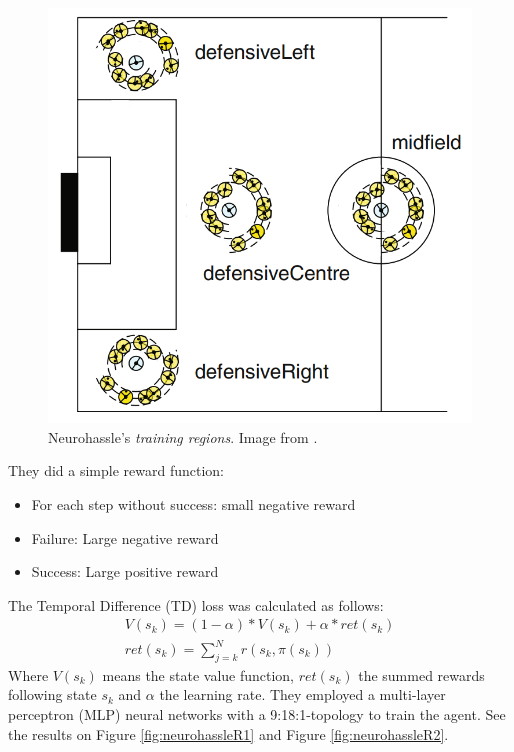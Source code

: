 \begin{figure}[H]
    \centering
    \includegraphics[scale=0.25]{images/neurohassleTR.png}
    \caption{Neurohassle's \textit{training regions}. Image from \cite{neurohassle}.}
    \label{fig:neurohassleTR}
\end{figure}

They did a simple reward function:
\begin{itemize}
    \item For each step without success: small negative reward 
    \item Failure: Large negative reward
    \item Success: Large positive reward
\end{itemize}

The Temporal Difference (TD) loss was calculated as follows:
\begin{gather*}
\label{eq1}
V(s_k) = (1-\alpha)*V(s_k) + \alpha*ret(s_k)
\\
ret(s_k) = \sum_{j=k}^{N} r(s_k, \pi(s_k))
\end{gather*}
Where $V(s_k)$ means the state value function, $ret(s_k)$ the summed rewards following state $s_k$ and $\alpha$ the learning rate. They employed a multi-layer perceptron (MLP) neural networks \cite{mlp} with a 9:18:1-topology to train the agent. See the results on Figure \ref{fig:neurohassleR1} and Figure \ref{fig:neurohassleR2}.

